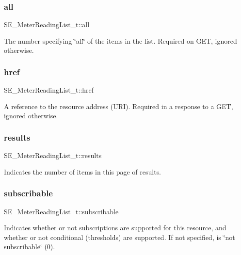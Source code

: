 \subsubsection{\texorpdfstring{all}{all}}
{\footnotesize\ttfamily S\+E\+\_\+\+Meter\+Reading\+List\+\_\+t\+::all}

The number specifying \char`\"{}all\char`\"{} of the items in the list. Required on G\+ET, ignored otherwise. \mbox{\label{group__MeterReadingList_ga9844ad12c7c11e9daaf78abd11948bd3}} 
\subsubsection{\texorpdfstring{href}{href}}
{\footnotesize\ttfamily S\+E\+\_\+\+Meter\+Reading\+List\+\_\+t\+::href}

A reference to the resource address (U\+RI). Required in a response to a G\+ET, ignored otherwise. \mbox{\label{group__MeterReadingList_gaa8caed66ab18310024f727817493b458}} 
\subsubsection{\texorpdfstring{results}{results}}
{\footnotesize\ttfamily S\+E\+\_\+\+Meter\+Reading\+List\+\_\+t\+::results}

Indicates the number of items in this page of results. \mbox{\label{group__MeterReadingList_gaa6c784a3bde1acd210ee5d07f3b7ea78}} 
\subsubsection{\texorpdfstring{subscribable}{subscribable}}
{\footnotesize\ttfamily S\+E\+\_\+\+Meter\+Reading\+List\+\_\+t\+::subscribable}

Indicates whether or not subscriptions are supported for this resource, and whether or not conditional (thresholds) are supported. If not specified, is \char`\"{}not subscribable\char`\"{} (0). 